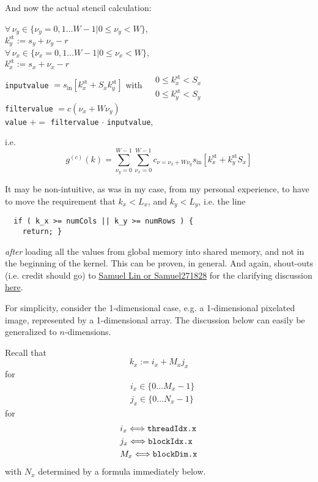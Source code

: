 \documentclass[10pt]{amsart}
\begin{document}
\begin{multicols*}{2}
And now the actual stencil calculation:

$\forall \, \nu_y \in \lbrace \nu_y = 0 , 1 \dots W-1 | 0 \leq \nu_y < W \rbrace$, \\
\phantom{ \qquad \, } $k_y^{\text{st}} := s_y + \nu_y - r$ \\
\phantom{ \qquad \, } $\forall \, \nu_x \in \lbrace \nu_x = 0 , 1 \dots W-1 | 0 \leq \nu_x < W \rbrace$, \\
\phantom{ \qquad \qquad \, } $k_x^{\text{st}} := s_x + \nu_x -r $ \\
\phantom{ \qquad \qquad \, } \verb|inputvalue| $=s_{\text{in}}[k^{\text{st}}_x + S_x k_y^{\text{st}}]$ with $\begin{aligned} & \quad \\
  & 0 \leq k_x^{\text{st}} < S_x \\ 
  & 0 \leq k_y^{\text{st}} < S_y  \end{aligned}$ \\
\phantom{ \qquad \qquad \, } \verb|filtervalue| $ = c(\nu_x + W\nu_y)$  \\
\phantom{ \qquad \qquad \, } \verb|value| $+=$ \verb|filtervalue| $\cdot$ \verb|inputvalue|,

i.e.
\[
g^{(c)}(k) = \sum_{\nu_y=0}^{W-1} \sum_{\nu_x =0}^{W-1} c_{\nu = \nu_x + W \nu_y} s_{\text{in}}[k_x^{\text{st}} + k_y^{\text{st}}S_x]
\]

\hrulefill

It may be non-intuitive, as was in my case, from my personal experience, to have to move the requirement that $k_x < L_x$, and $k_y <L_y$, i.e. the line

\begin{lstlisting}
  if ( k_x >= numCols || k_y >= numRows ) {
    return; }
  \end{lstlisting}
\emph{after} loading all the values from global memory into shared memory, and not in the beginning of the kernel.  This can be proven, in general.  And again, shout-outs (i.e. credit should go) to \href{https://discussions.udacity.com/users/Samuel271828}{Samuel Lin or Samuel271828} for the clarifying discussion \href{https://discussions.udacity.com/t/any-one-completed-problem-set-2-using-shared-memory/158442/6}{here}.

For simplicity, consider the 1-dimensional case, e.g. a 1-dimensional pixelated image, represented by a 1-dimensional array.  The discussion below can easily be generalized to $n$-dimensions.

Recall that
\[
k_x := i_x + M_x j_x 
\]
for
\[
\begin{aligned}
  & i_x \in \lbrace 0 \dots M_x - 1 \rbrace \\ 
  & j_x \in \lbrace 0 \dots N_x - 1 \rbrace
\end{aligned}
\]
for
\[
\begin{aligned}
& i_x \Longleftrightarrow \verb|threadIdx.x| \\ 
& j_x \Longleftrightarrow \verb|blockIdx.x| \\ 
& M_x \Longleftrightarrow \verb|blockDim.x|
\end{aligned}
\]
with $N_x$ determined by a formula immediately below.  


\end{multicols*}
\end{document}
